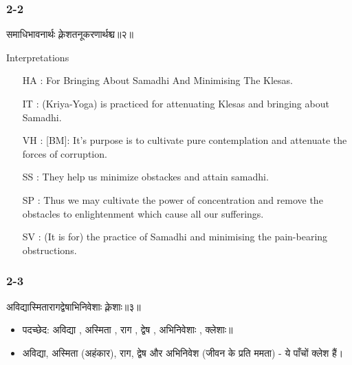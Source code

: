 \begin{frame}[fragile]\frametitle{2-2}
\begin{sanskrit}
समाधिभावनार्थः क्लेशतनूकरणार्थश्च॥२॥
\end{sanskrit}

Interpretations
\begin{itemize}
\item [HA]: For Bringing About Samadhi And Minimising The Klesas.
\item [IT]: (Kriya-Yoga) is practiced for attenuating Klesas and bringing about Samadhi.
\item [VH]: [BM]: It’s purpose is to cultivate pure contemplation and attenuate the forces of corruption.
\item [SS]: They help us minimize obstackes and attain samadhi.
\item [SP]: Thus we may cultivate the power of concentration and remove the obstacles to enlightenment which cause all our sufferings.
\item [SV]: (It is for) the practice of Samadhi and minimising the pain-bearing obstructions. 
\end{itemize}
	
\end{frame}



\begin{frame}[fragile]\frametitle{2-3}
\begin{sanskrit}
अविद्यास्मितारागद्वेषाभिनिवेशाः क्लेशाः॥३॥
\end{sanskrit}

\begin{itemize}
\item पदच्छेद: अविद्या , अस्मिता , राग , द्वेष , अभिनिवेशाः , क्लेशाः॥
\item अविद्या, अस्मिता (अहंकार), राग, द्वेष और अभिनिवेश (जीवन के प्रति ममता) - ये पाँचों क्लेश हैं।
\end{itemize}
	
\end{frame}



